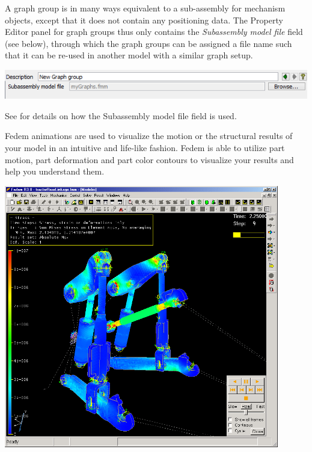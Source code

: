 
A graph group is in many ways equivalent to a sub-assembly for
mechanism objects, except that it does not contain any positioning data.
The Property Editor panel for graph groups thus only contains the
{\sl Subassembly model file} field (see below), through which the graph
groups can be assigned a file name such that it can be re-used in
another model with a similar graph setup.

\noindent
\includegraphics[width=\textwidth]{Figures/7-GraphGroupProperty}

See 
for details on how the Subassembly model file field is used.

\clearpage



Fedem animations are used to visualize the motion or the structural results of
your model in an intuitive and life-like fashion. Fedem is able to
utilize part motion, part deformation and
part color contours to visualize
your results and help you understand them.

\begin{center}
  \includegraphics[width=0.9\textwidth]{Figures/AnimationStresstractorRearLinkage}
\end{center}

